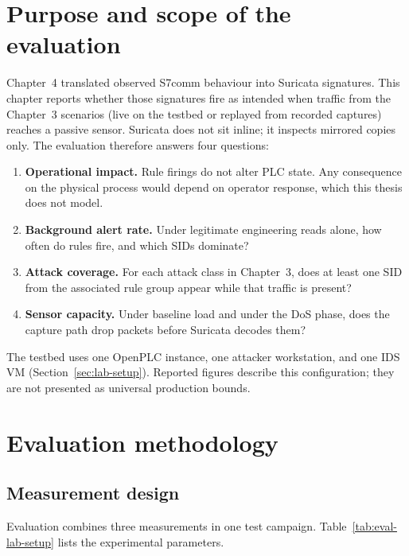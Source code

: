 \documentclass[../main.tex]{subfiles}
\begin{document}
\section{Purpose and scope of the evaluation}
\label{sec:eval-objectives}

Chapter~4 translated observed S7comm behaviour into Suricata signatures. This chapter reports whether those signatures fire as intended when traffic from the Chapter~3 scenarios (live on the testbed or replayed from recorded captures) reaches a passive sensor. Suricata does not sit inline; it inspects mirrored copies only. The evaluation therefore answers four questions:

\begin{enumerate}
    \item \textbf{Operational impact.} Rule firings do not alter PLC state. Any consequence on the physical process would depend on operator response, which this thesis does not model.

    \item \textbf{Background alert rate.} Under legitimate engineering reads alone, how often do rules fire, and which SIDs dominate?

    \item \textbf{Attack coverage.} For each attack class in Chapter~3, does at least one SID from the associated rule group appear while that traffic is present?

    \item \textbf{Sensor capacity.} Under baseline load and under the DoS phase, does the capture path drop packets before Suricata decodes them?
\end{enumerate}

The testbed uses one OpenPLC instance, one attacker workstation, and one IDS VM (Section~\ref{sec:lab-setup}). Reported figures describe this configuration; they are not presented as universal production bounds.

\section{Evaluation methodology}
\label{sec:eval-setup}

\subsection{Measurement design}

Evaluation combines three measurements in one test campaign. Table~\ref{tab:eval-lab-setup} lists the experimental parameters.
\end{document}
